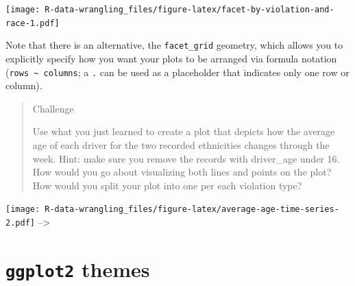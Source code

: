 \documentclass[]{book}
\newenvironment{Shaded}{\begin{snugshade}}{\end{snugshade}}
\newcommand{\KeywordTok}[1]{\textcolor[rgb]{0.13,0.29,0.53}{\textbf{#1}}}
\newcommand{\DataTypeTok}[1]{\textcolor[rgb]{0.13,0.29,0.53}{#1}}
\newcommand{\DecValTok}[1]{\textcolor[rgb]{0.00,0.00,0.81}{#1}}
\newcommand{\StringTok}[1]{\textcolor[rgb]{0.31,0.60,0.02}{#1}}
\newcommand{\CommentTok}[1]{\textcolor[rgb]{0.56,0.35,0.01}{\textit{#1}}}
\newcommand{\OtherTok}[1]{\textcolor[rgb]{0.56,0.35,0.01}{#1}}
\newcommand{\OperatorTok}[1]{\textcolor[rgb]{0.81,0.36,0.00}{\textbf{#1}}}
\newcommand{\NormalTok}[1]{#1}
\theoremstyle{definition}
\theoremstyle{definition}
\theoremstyle{definition}
\theoremstyle{remark}
\begin{document}
\texttt{[image: R-data-wrangling\_files/figure-latex/facet-by-violation-and-race-1.pdf]}

Note that there is an alternative, the \texttt{facet\_grid} geometry,
which allows you to explicitly specify how you want your plots to be
arranged via formula notation
(\texttt{rows\ \textasciitilde{}\ columns}; a \texttt{.} can be used as
a placeholder that indicates only one row or column).

\begin{quote}
Challenge

Use what you just learned to create a plot that depicts how the average
age of each driver for the two recorded ethnicities changes through the
week. Hint: make sure you remove the records with driver\_age under 16.
How would you go about visualizing both lines and points on the plot?
How would you split your plot into one per each violation type?
\end{quote}

\begin{Shaded}
\end{Shaded}

\texttt{[image: R-data-wrangling\_files/figure-latex/average-age-time-series-2.pdf]}
--\textgreater{}

\section{\texorpdfstring{\textbf{\texttt{ggplot2}}
themes}{ggplot2 themes}}\label{ggplot2-themes}
\end{document}
